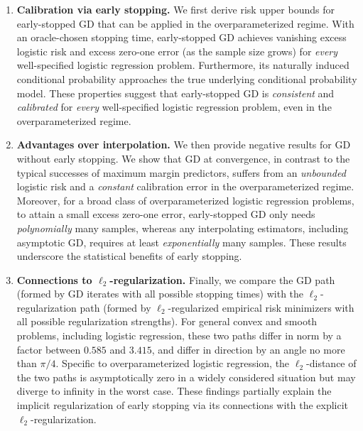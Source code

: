 \documentclass[11pt]{article}
\begin{document}
\begin{enumerate}[leftmargin=*]
\item \textbf{Calibration via early stopping.} 
We first derive risk upper bounds for early-stopped GD that can be applied in the overparameterized regime. 
With an oracle-chosen stopping time, early-stopped GD achieves vanishing excess logistic risk and excess zero-one error (as the sample size grows) for \emph{every} well-specified logistic regression problem. Furthermore, its naturally induced conditional probability approaches the true underlying conditional probability model.
These properties suggest that early-stopped GD is \emph{consistent} and \emph{calibrated} for \emph{every} well-specified logistic regression problem, even in the overparameterized regime.  


\item \textbf{Advantages over interpolation.} We then provide negative results for GD without early stopping. 
We show that GD at convergence,
in contrast to the typical successes of maximum margin predictors,
suffers from an \emph{unbounded} logistic risk and a \emph{constant} calibration error in the overparameterized regime. 
Moreover, for a broad class of overparameterized logistic regression problems, to attain a small excess zero-one error, early-stopped GD only needs \emph{polynomially} many samples, whereas any interpolating estimators, including asymptotic GD, requires at least \emph{exponentially} many samples. 
These results underscore the statistical benefits of early stopping.

\item \textbf{Connections to $\ell_2$-regularization.} Finally, we compare the GD path (formed by GD iterates with all possible stopping times) with the $\ell_2$-regularization path (formed by $\ell_2$-regularized empirical risk minimizers with all possible regularization strengths). For general convex and smooth problems, including logistic regression, these two paths differ in norm by a factor between $0.585$ and $3.415$, and differ in direction by an angle no more than $\pi/4$. 
Specific to overparameterized logistic regression, the $\ell_2$-distance of the two paths is asymptotically zero in a widely considered situation but may diverge to infinity in the worst case. 
These findings partially explain the implicit regularization of early stopping via its connections with the explicit $\ell_2$-regularization.
\end{enumerate}
\end{document}

